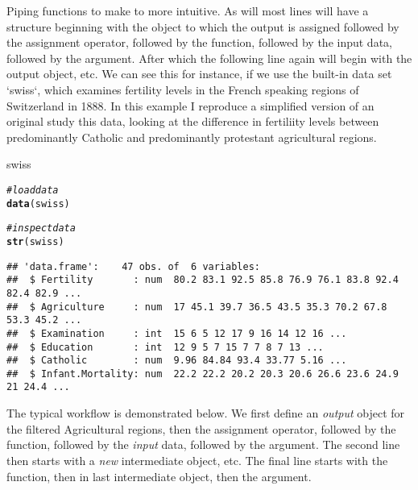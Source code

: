 \documentclass[a4paper,oneside,british]{book}\usepackage[]{graphicx}\usepackage[]{color}
\makeatletter
\newcommand{\hlcom}[1]{\textcolor[rgb]{0.678,0.584,0.686}{\textit{#1}}}%
\newcommand{\hlstd}[1]{\textcolor[rgb]{0.345,0.345,0.345}{#1}}%
\newcommand{\hlkwd}[1]{\textcolor[rgb]{0.737,0.353,0.396}{\textbf{#1}}}%
\newenvironment{kframe}{%
 \def\at@end@of@kframe{}%
 \ifinner\ifhmode%
  \def\at@end@of@kframe{\end{minipage}}%
  \begin{minipage}{\columnwidth}%
 \fi\fi%
 \def\FrameCommand##1{\hskip\@totalleftmargin \hskip-\fboxsep
 \colorbox{shadecolor}{##1}\hskip-\fboxsep
     \hskip-\linewidth \hskip-\@totalleftmargin \hskip\columnwidth}%
 \MakeFramed {\advance\hsize-\width
   \@totalleftmargin\z@ \linewidth\hsize
   \@setminipage}}%
 {\par\unskip\endMakeFramed%
 \at@end@of@kframe}
\newenvironment{knitrout}{}{} %
\makeatother
\begin{document}
Piping functions to make to more intuitive. As will most lines will
have a structure beginning with the object to which the output is
assigned followed by the assignment operator, followed by the function,
followed by the input data, followed by the argument. After which
the following line again will begin with the output object, etc. We
can see this for instance, if we use the built-in data set `swiss`,
which examines fertility levels in the French speaking regions of
Switzerland in 1888. In this example I reproduce a simplified version
of an original study this data, looking at the difference in fertiliity
levels between predominantly Catholic and predominantly protestant
agricultural regions.

\begin{table}[H]
\caption{swiss}

\begin{knitrout}
\color{fgcolor}\begin{kframe}
\begin{alltt}
\hlcom{# load data}
\hlkwd{data}\hlstd{(swiss)}

\hlcom{# inspect data}
\hlkwd{str}\hlstd{(swiss)}
\end{alltt}
\begin{verbatim}
## 'data.frame':	47 obs. of  6 variables:
##  $ Fertility       : num  80.2 83.1 92.5 85.8 76.9 76.1 83.8 92.4 82.4 82.9 ...
##  $ Agriculture     : num  17 45.1 39.7 36.5 43.5 35.3 70.2 67.8 53.3 45.2 ...
##  $ Examination     : int  15 6 5 12 17 9 16 14 12 16 ...
##  $ Education       : int  12 9 5 7 15 7 7 8 7 13 ...
##  $ Catholic        : num  9.96 84.84 93.4 33.77 5.16 ...
##  $ Infant.Mortality: num  22.2 22.2 20.2 20.3 20.6 26.6 23.6 24.9 21 24.4 ...
\end{verbatim}
\end{kframe}
\end{knitrout}
\end{table}

The typical workflow is demonstrated below. We first define an \emph{output}
object for the filtered Agricultural regions, then the assignment
operator, followed by the function, followed by the \emph{input} data,
followed by the argument. The second line then starts with a \emph{new
}intermediate object, etc. The final line starts with the function,
then in last intermediate object, then the argument.
\end{document}
